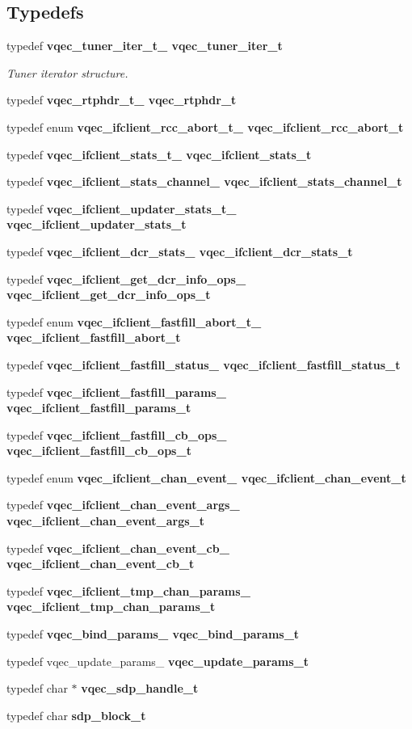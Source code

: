 \subsection*{Typedefs}
\begin{CompactItemize}
\item 
typedef \bf{vqec\_\-tuner\_\-iter\_\-t\_\-} \bf{vqec\_\-tuner\_\-iter\_\-t}
\begin{CompactList}\small\item\em Tuner iterator structure. \item\end{CompactList}\item 
typedef \bf{vqec\_\-rtphdr\_\-t\_\-} \bf{vqec\_\-rtphdr\_\-t}
\item 
typedef enum \bf{vqec\_\-ifclient\_\-rcc\_\-abort\_\-t\_\-} \bf{vqec\_\-ifclient\_\-rcc\_\-abort\_\-t}
\item 
typedef \bf{vqec\_\-ifclient\_\-stats\_\-t\_\-} \bf{vqec\_\-ifclient\_\-stats\_\-t}
\item 
typedef \bf{vqec\_\-ifclient\_\-stats\_\-channel\_\-} \bf{vqec\_\-ifclient\_\-stats\_\-channel\_\-t}
\item 
typedef \bf{vqec\_\-ifclient\_\-updater\_\-stats\_\-t\_\-} \bf{vqec\_\-ifclient\_\-updater\_\-stats\_\-t}
\item 
typedef \bf{vqec\_\-ifclient\_\-dcr\_\-stats\_\-} \bf{vqec\_\-ifclient\_\-dcr\_\-stats\_\-t}
\item 
typedef \bf{vqec\_\-ifclient\_\-get\_\-dcr\_\-info\_\-ops\_\-} \bf{vqec\_\-ifclient\_\-get\_\-dcr\_\-info\_\-ops\_\-t}
\item 
typedef enum \bf{vqec\_\-ifclient\_\-fastfill\_\-abort\_\-t\_\-} \bf{vqec\_\-ifclient\_\-fastfill\_\-abort\_\-t}
\item 
typedef \bf{vqec\_\-ifclient\_\-fastfill\_\-status\_\-} \bf{vqec\_\-ifclient\_\-fastfill\_\-status\_\-t}
\item 
typedef \bf{vqec\_\-ifclient\_\-fastfill\_\-params\_\-} \bf{vqec\_\-ifclient\_\-fastfill\_\-params\_\-t}
\item 
typedef \bf{vqec\_\-ifclient\_\-fastfill\_\-cb\_\-ops\_\-} \bf{vqec\_\-ifclient\_\-fastfill\_\-cb\_\-ops\_\-t}
\item 
typedef enum \bf{vqec\_\-ifclient\_\-chan\_\-event\_\-} \bf{vqec\_\-ifclient\_\-chan\_\-event\_\-t}
\item 
typedef \bf{vqec\_\-ifclient\_\-chan\_\-event\_\-args\_\-} \bf{vqec\_\-ifclient\_\-chan\_\-event\_\-args\_\-t}
\item 
typedef \bf{vqec\_\-ifclient\_\-chan\_\-event\_\-cb\_\-} \bf{vqec\_\-ifclient\_\-chan\_\-event\_\-cb\_\-t}
\item 
typedef \bf{vqec\_\-ifclient\_\-tmp\_\-chan\_\-params\_\-} \bf{vqec\_\-ifclient\_\-tmp\_\-chan\_\-params\_\-t}
\item 
typedef \bf{vqec\_\-bind\_\-params\_\-} \bf{vqec\_\-bind\_\-params\_\-t}
\item 
typedef vqec\_\-update\_\-params\_\- \bf{vqec\_\-update\_\-params\_\-t}
\item 
typedef char $\ast$ \bf{vqec\_\-sdp\_\-handle\_\-t}
\item 
typedef char \bf{sdp\_\-block\_\-t}
\end{CompactItemize}
